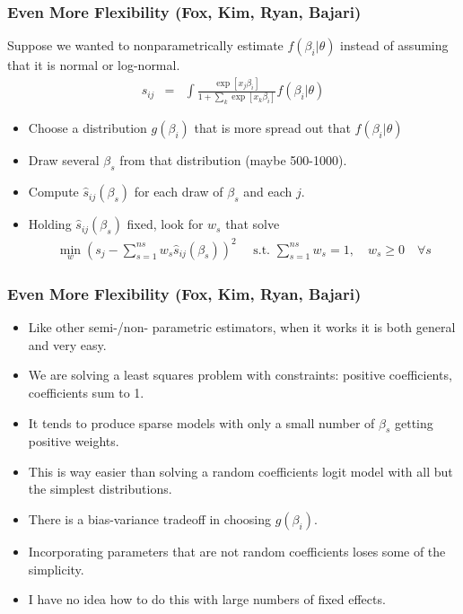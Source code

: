 \documentclass[xcolor=pdftex,dvipsnames,table,mathserif,aspectratio=169]{beamer}
\begin{document}
\begin{frame}
\frametitle{Even More Flexibility (Fox, Kim, Ryan, Bajari)}
Suppose we wanted to nonparametrically estimate $f(\beta_i | \theta)$ instead of assuming that it is normal or log-normal.
\begin{eqnarray*}
s_{ij} &=& \int \frac{\exp[x_{j} \beta_i  ]}{1+\sum_k \exp[x_{k} \beta_i  ]} f(\beta_i | \theta)
\end{eqnarray*}
\begin{itemize}
\item Choose a distribution $g(\beta_i)$ that is more spread out that $f(\beta_i | \theta)$
\item Draw several $\beta_{s}$ from that distribution (maybe 500-1000).
\item Compute $\hat{s}_{ij}(\beta_s)$ for each draw of $\beta_s$ and each $j$.
\item Holding $\hat{s}_{ij}(\beta_s)$ fixed, look for $w_s$ that solve
\begin{eqnarray*}
\min_w \left(s_j -  \sum_{s=1}^{ns} w_s \hat{s}_{ij}(\beta_s) \right)^2 \quad \mbox{ s.t. } \sum_{s=1}^{ns} w_s = 1, \quad w_s \geq 0 \quad \forall s
\end{eqnarray*}
\end{itemize}
\end{frame}

\begin{frame}
\frametitle{Even More Flexibility (Fox, Kim, Ryan, Bajari)}
\begin{itemize}
\item Like other semi-/non- parametric estimators, when it works it is both general and very easy.
\item We are solving a least squares problem with constraints: positive coefficients, coefficients sum to 1.
\item It tends to produce \alert{sparse models} with only a small number of $\beta_s$ getting positive weights.
\item This is way easier than solving a random coefficients logit model with all but the simplest distributions.
\item There is a bias-variance tradeoff in choosing $g(\beta_i)$.
\item Incorporating parameters that are not random coefficients loses some of the simplicity.
\item I have no idea how to do this with large numbers of fixed effects.
\end{itemize}
\end{frame}
\end{document}
